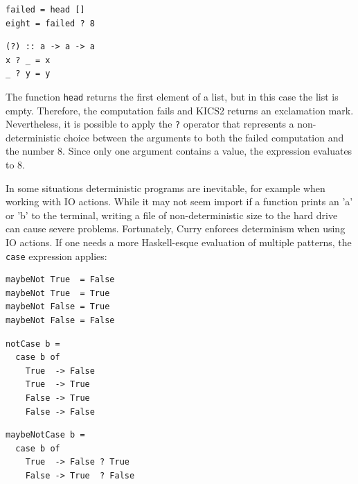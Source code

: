 \documentclass[fleqn, abstract=on]{scrreprt}
\begin{document}
\par
\begin{minipage}{.5 \linewidth}
\begin{verbatim}
failed = head []
eight = failed ? 8
\end{verbatim}
\end{minipage}
\begin{minipage}{.5 \linewidth}
\begin{verbatim}
(?) :: a -> a -> a
x ? _ = x
_ ? y = y
\end{verbatim}
\end{minipage}
\vspace{.5em}
\par \noindent
The function \texttt{head} returns the first element of a list, but in this case the list is empty. Therefore, the computation fails and KICS2 returns an exclamation mark. Nevertheless, it is possible to apply the \texttt{?} operator that represents a non-deterministic choice between the arguments to both the failed computation and the number 8. Since only one argument contains a value, the expression evaluates to 8.
\par
In some situations deterministic programs are inevitable, for example when working with IO actions. While it may not seem import if a function prints an 'a' or 'b' to the terminal, writing a file of non-deterministic size to the hard drive can cause severe problems. Fortunately, Curry enforces determinism when using IO actions. If one needs a more Haskell-esque evaluation of multiple patterns, the \texttt{case} expression applies:
\begin{flushleft}
	\begin{minipage}[t]{.33 \linewidth}
	\begin{verbatim}
maybeNot True  = False
maybeNot True  = True
maybeNot False = True
maybeNot False = False
	\end{verbatim}
\end{minipage}
\begin{minipage}[t]{.3 \linewidth}
	\begin{verbatim}
notCase b =
  case b of
    True  -> False
    True  -> True
    False -> True
    False -> False
	\end{verbatim}
\end{minipage}
\begin{minipage}[t]{.3 \linewidth}
	\begin{verbatim}
maybeNotCase b =
  case b of
    True  -> False ? True 
    False -> True  ? False
	\end{verbatim}
\end{minipage}
\end{flushleft}
\end{document}
